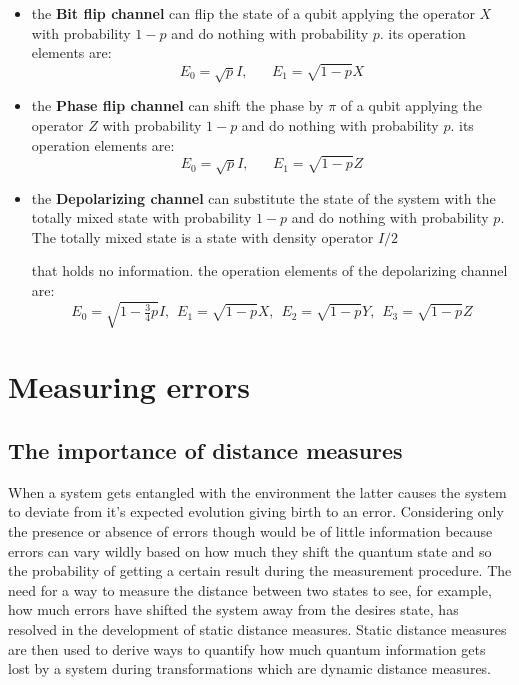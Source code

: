 \documentclass{article}
\begin{document}
\begin{itemize}

	\item the \textbf{Bit flip channel} can flip the state of a qubit applying
	      the operator $X$ with probability $1-p$ and do nothing with
	      probability $p$.
	      its operation elements are:
	      \begin{equation}
		      E_0 = \sqrt{p}I, \hspace{20pt} E_1 = \sqrt{1-p}X
	      \end{equation}

	\item the \textbf{Phase flip channel} can shift the phase by $\pi$ of a qubit applying
	      the operator $Z$ with probability $1-p$ and do nothing with
	      probability $p$.
	      its operation elements are:
	      \begin{equation}
		      E_0 = \sqrt{p}I, \hspace{20pt} E_1 = \sqrt{1-p}Z
	      \end{equation}

	\item the \textbf{Depolarizing channel} can substitute the state of the system with the
	      totally mixed state with probability $1-p$ and do nothing with
	      probability $p$.
	      The totally mixed state is a state with density operator $I/2$

	      that holds no information.
	      the operation elements of the depolarizing channel are:
	      \begin{equation}
		      E_0 = \sqrt{1-\tfrac{3}{4}p}I, \hspace{5pt} E_1 = \sqrt{1-p}X , \hspace{5pt}
		      E_2 = \sqrt{1-p}Y , \hspace{5pt} E_3 = \sqrt{1-p}Z
	      \end{equation}


\end{itemize}

\section{Measuring errors}

\subsection{The importance of distance measures}

When a system gets entangled with the environment the latter causes the system
to deviate from it's expected evolution giving birth to an error.
Considering only the presence or absence of errors though would be of little
information because errors can vary wildly based on how much they shift the
quantum state and so the probability of getting a certain result during
the measurement procedure.
The need for a way to measure the distance between two states to see, for example,
how much errors have shifted the system away from the desires state, has resolved
in the development of static distance measures.
Static distance measures are then used to derive ways to quantify how much quantum
information gets lost by a system during transformations which are dynamic distance
measures.
\end{document}
